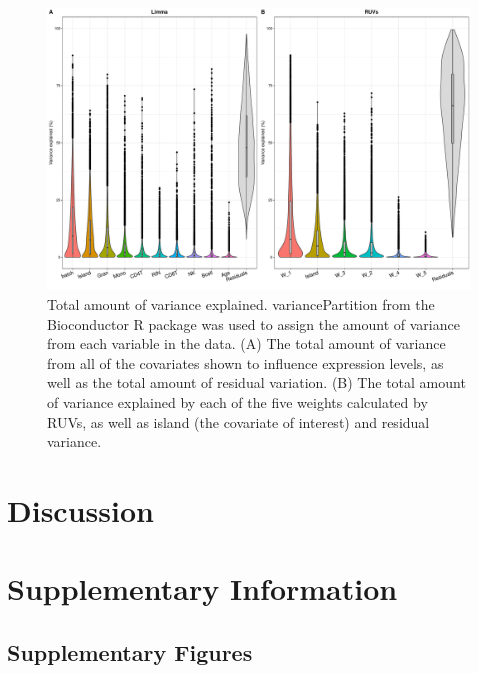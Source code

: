 \documentclass[12pt,a4paper,titlepage,twoside,openright]{book}
\begin{document}
\begin{mainmatter}
\begin{figure}[htb!]
\centering
\includegraphics[width=\textwidth,height=\textheight,keepaspectratio]{VarianceExplained_LMvsRUVs.pdf}
\caption{Total amount of variance explained. variancePartition from the Bioconductor R package was used to assign the amount of variance from each variable in the data. (A) The total amount of variance from all of the covariates shown to influence expression levels, as well as the total amount of residual variation. (B) The total amount of variance explained by each of the five weights calculated by RUVs, as well as island (the covariate of interest) and residual variance.}
\label{fig:Variance Explained}
\end{figure}

\chapter{Discussion}\label{}

\chapter{Supplementary Information}\label{}

\section{Supplementary Figures}


\end{mainmatter}
\end{document}
